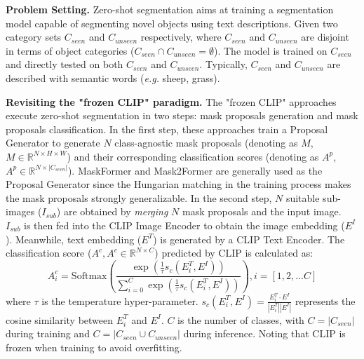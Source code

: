 
\noindent \textbf{Problem Setting.}
Zero-shot segmentation aims at training a segmentation model capable of segmenting novel objects using text descriptions. Given two category sets $C_{seen}$ and $C_{unseen}$ respectively, where $C_{seen}$ and $C_{unseen}$ are disjoint in terms of object categories ($C_{seen} \cap C_{unseen} = \emptyset$). The model is trained on $C_{seen}$ and directly tested on both $C_{seen}$ and $C_{unseen}$. Typically, $C_{seen}$ and $C_{unseen}$ are described with semantic words (\textit{e.g.} sheep, grass).

\noindent \textbf{Revisiting the "frozen CLIP" paradigm.}
\label{sec:Revisiting}
The "frozen CLIP" approaches \cite{zegformer, zsseg, freeseg, ovseg} execute zero-shot segmentation in two steps: mask proposals generation and mask proposals classification. 
In the first step, these approaches train a Proposal Generator to generate $N$ class-agnostic mask proposals (denoting as $M$, $M \in \mathbb{R}^{N \times H \times W}$) and their corresponding classification scores (denoting as $A^{p}$, $A^{p} \in \mathbb{R}^{N \times |C_{seen}|}$). MaskFormer \cite{cheng2021maskformer} and Mask2Former \cite{cheng2021mask2former} are generally used as the Proposal Generator since the Hungarian matching \cite{kuhn1955hungarian} in the training process makes the mask proposals strongly generalizable.
In the second step, $N$ suitable sub-images ($I_{sub}$) are obtained by \textit{merging} $N$ mask proposals and the input image. $I_{sub}$ is then fed into the CLIP Image Encoder to obtain the image embedding ($E^I$). Meanwhile, text embedding ($E^T$) is generated by a CLIP Text Encoder. The classification score ($A^{c}, A^{c}  \in \mathbb{R}^{N \times C}$) predicted by CLIP is calculated as:
\begin{equation}
\label{eq:prob} 
A^{c}_i = \mathrm{Softmax}(\frac{\exp(\frac{1}{\tau}s_{c} (E^T_{i}, E^I))}{\sum_{i=0}^{C}\exp(\frac{1}{\tau}s_{c}(E^T_{i}, E^I))}), i = [1,2,...C]
\end{equation}
where  $\tau$ is the temperature hyper-parameter. $s_{c}(E^T_{i}, E^I)=\frac{E^T_{i} \cdot E^I }{|E^T_{i}| |E^I|}$ represents the cosine similarity between $E^T_{i}$ and $E^I$. $C$ is the number of classes, with $C = |C_{seen}|$ during training and $C = |C_{seen}\cup C_{unseen}|$ during inference. Noting that CLIP is frozen when training to avoid overfitting.


